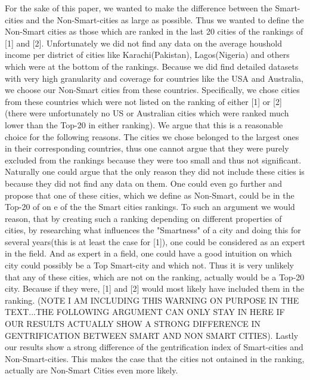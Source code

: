 \documentclass[a4paper, 10pt, conference]{ieeeconf}      %
\begin{document}
For the sake of this paper, we wanted to make the difference between the Smart-cities and the Non-Smart-cities as large as possible.
Thus we wanted to define the Non-Smart cities as those which are ranked in the last 20 cities of the rankings of [1] and [2]. 
Unfortunately we did not find any data on the average houshold income per district of cities like Karachi(Pakistan), Lagos(Nigeria)
and others which were at the bottom of the rankings. Because we did find detailed datasets with very high granularity and coverage
for countries like the USA and Australia, we choose our Non-Smart cities from these countries. Specifically, we chose cities from
these countries which were not listed on the ranking of either [1] or [2] (there were unfortunately no US or Australian cities which
were ranked much lower than the Top-20 in either ranking). We argue that this is a reasonable choice for the following reasons. The
cities we chose belonged to the largest ones in their corresponding countries, thus one cannot argue that they were purely excluded
from the rankings because they were too small and thus not significant. Naturally one could argue that the only reason they did not
include these cities is because they did not find any data on them. One could even go further and propose that one of these cities, 
which we define as Non-Smart, could be in the Top-20 of on e of the the Smart cities rankings. To such an argument we would reason, 
that by creating such a ranking depending on different properties of cities, by researching what influences the "Smartness" of a city
and doing this for several years(this is at least the case for [1]), one could be considered as an expert in the field. And as expert 
in a field, one could have a good intuition on which city could possibly be a Top Smart-city and which not. Thus it is very unlikely 
that any of these cities, which are not on the ranking, actually would be a Top-20 city. Because if they were, [1] and [2] would most 
likely have included them in the ranking. (NOTE I AM INCLUDING THIS WARNING ON PURPOSE IN THE TEXT...THE FOLLOWING ARGUMENT CAN ONLY
STAY IN HERE IF OUR RESULTS ACTUALLY SHOW A STRONG DIFFERENCE IN GENTRIFICATION BETWEEN SMART AND NON SMART CITIES). Lastly our results 
show a strong difference of the gentrification index of Smart-cities and Non-Smart-cities. This makes the case that the cities not 
ontained in the ranking, actually are Non-Smart Cities even more likely. 
\end{document}

